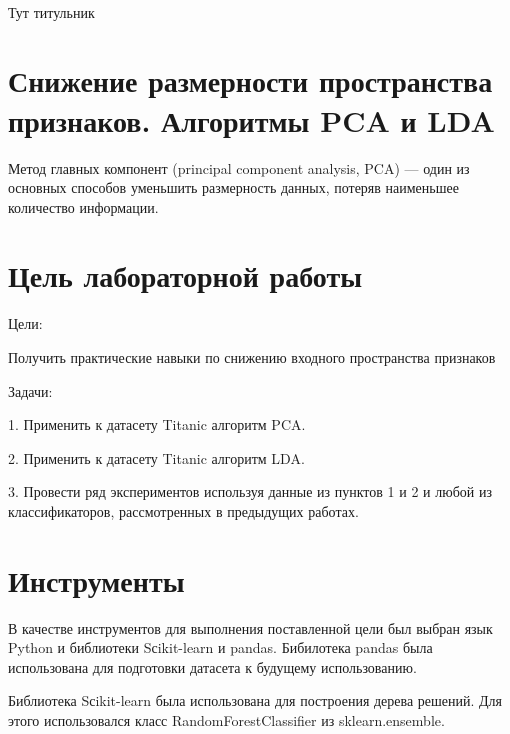 \documentclass[a4paper,12pt]{article}
\begin{document}
\begin{titlepage}
\newpage

\

Тут титульник
\end{titlepage}

\newpage
\tableofcontents
\setcounter{page}{2}


\newpage\section{Снижение размерности пространства признаков. Алгоритмы PCA и LDA} 
	Метод главных компонент (principal component analysis, PCA) — один из основных способов уменьшить размерность данных, потеряв наименьшее количество информации. 
	
	\vspace{0.5cm}
	
	
	
\newpage\section{Цель лабораторной работы} 
	Цели: 
	\vspace{0.5cm}
	
	Получить практические навыки по снижению входного пространства признаков
	
	\vspace{0.5cm}
	Задачи: 
	
	\vspace{0.5cm}
	1. Применить к датасету Titanic алгоритм PCA.
	
	\vspace{0.5cm}
	2. Применить к датасету Titanic алгоритм LDA.
	
	\vspace{0.5cm}
	3. Провести ряд экспериментов используя данные из пунктов 1 и 2 и любой из классификаторов, рассмотренных в предыдущих работах.
	
	
\newpage\section{Инструменты} 
	В качестве инструментов для выполнения поставленной цели был выбран язык Python и библиотеки Sсikit-learn и pandas.
	Бибилотека pandas была использована для подготовки датасета к будущему использованию.
	
	\vspace{0.5cm}
	Библиотека Sсikit-learn была использована для построения дерева решений. Для этого использовался класс RandomForestClassifier из sklearn.ensemble. 
	
\end{document}
